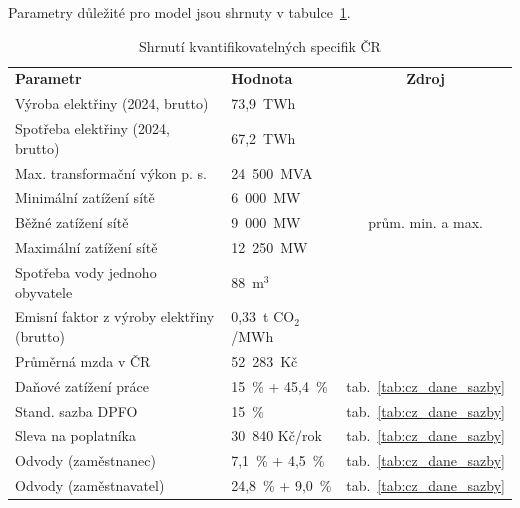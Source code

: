 Parametry důležité pro model jsou shrnuty v tabulce~\ref{tab:parametry_modelu_cz}.

\begin{landscape} \begin{table}[p] \centering \setlength{\tabcolsep}{26pt}

    \caption{Shrnutí kvantifikovatelných specifik ČR}
    \label{tab:parametry_modelu_cz}

    \begin{tabular}{llc}
        \toprule
        \addlinespace
        \textbf{Parametr} & \textbf{Hodnota} & \textbf{Zdroj} \\

        \addlinespace
		\midrule
		\addlinespace

        Výroba elektřiny (2024, brutto)    & 73,9~TWh &~\cite{energeticky_regulacni_urad_rocni_2025} \\
        Spotřeba elektřiny (2024, brutto)    & 67,2~TWh &~\cite{energeticky_regulacni_urad_rocni_2025} \\
        Max. transformační výkon p. s.    & 24~500~MVA &~\cite[s.~127]{bartos_energetika_2025} \\
        \quad Minimální zatížení sítě    & 6~000~MW &~\cite{energeticky_regulacni_urad_rocni_2025} \\
        \quad Běžné zatížení sítě    & 9~000~MW & prům. min. a max. \\
        \quad Maximální zatížení sítě    & 12~250~MW &~\cite{bartos_energetika_2025} \\
        
        \addlinespace
        \midrule
        \addlinespace

        Spotřeba vody jednoho obyvatele    & 88~m$^3$ & \cite{horackova_vodni_2026}  \\
        Emisní faktor z výroby elektřiny (brutto) & 0,33~t CO$_2$/MWh &~\cite{energeticky_regulacni_urad_rocni_2025} \\

        \addlinespace
        \midrule
        \addlinespace

        Průměrná mzda v ČR    & 52~283~Kč & \cite{csu_prumerna_mzda_2026} \\

        \addlinespace
        \midrule
        \addlinespace

        Daňové zatížení práce    & 15~\% + 45,4~\% & tab.~\ref{tab:cz_dane_sazby} \\
        \quad Stand. sazba DPFO     & 15~\% & tab.~\ref{tab:cz_dane_sazby} \\
        \quad Sleva na poplatníka    & 30~840 Kč/rok & tab.~\ref{tab:cz_dane_sazby} \\
        \quad Odvody (zaměstnanec)    & 7,1~\% + 4,5~\% & tab.~\ref{tab:cz_dane_sazby} \\
        \quad Odvody (zaměstnavatel)    & 24,8~\% + 9,0~\% & tab.~\ref{tab:cz_dane_sazby} \\


\end{tabular}
\end{table}
\end{landscape}
